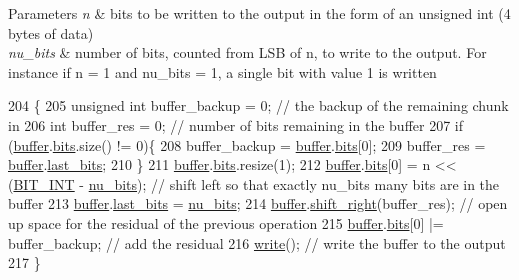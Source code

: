 \begin{DoxyParams}{Parameters}
{\em n} & bits to be written to the output in the form of an unsigned int (4 bytes of data) \\
\hline
{\em nu\+\_\+bits} & number of bits, counted from L\+SB of n, to write to the output. For instance if n = 1 and nu\+\_\+bits = 1, a single bit with value 1 is written \\
\hline
\end{DoxyParams}

\begin{DoxyCode}
204                                                                \{
205   \textcolor{keywordtype}{unsigned} \textcolor{keywordtype}{int} buffer\_backup = 0; \textcolor{comment}{// the backup of the remaining chunk in }
206   \textcolor{keywordtype}{int} buffer\_res = 0; \textcolor{comment}{// number of bits remaining in the buffer}
207   \textcolor{keywordflow}{if} (\hyperlink{classobitstream_aeaccad00a395a404aa16472bfa052be3}{buffer}.\hyperlink{classbit__pipe_a86f38af1e9736b053728033490476b50}{bits}.size() != 0)\{
208     buffer\_backup = \hyperlink{classobitstream_aeaccad00a395a404aa16472bfa052be3}{buffer}.\hyperlink{classbit__pipe_a86f38af1e9736b053728033490476b50}{bits}[0];
209     buffer\_res = \hyperlink{classobitstream_aeaccad00a395a404aa16472bfa052be3}{buffer}.\hyperlink{classbit__pipe_a0f3e84b02751803adaab499b5dad86fe}{last\_bits};
210   \}
211   \hyperlink{classobitstream_aeaccad00a395a404aa16472bfa052be3}{buffer}.\hyperlink{classbit__pipe_a86f38af1e9736b053728033490476b50}{bits}.resize(1);
212   \hyperlink{classobitstream_aeaccad00a395a404aa16472bfa052be3}{buffer}.\hyperlink{classbit__pipe_a86f38af1e9736b053728033490476b50}{bits}[0] = n << (\hyperlink{bitstream_8h_afcadf5aa65c5159bfb96c4d82ebc0a5d}{BIT\_INT} - \hyperlink{bitstream_8cpp_a9dfce6f51e3febb3973aa3b16c2fecb4}{nu\_bits}); \textcolor{comment}{// shift left so that exactly nu\_bits
       many bits are in the buffer}
213   \hyperlink{classobitstream_aeaccad00a395a404aa16472bfa052be3}{buffer}.\hyperlink{classbit__pipe_a0f3e84b02751803adaab499b5dad86fe}{last\_bits} = \hyperlink{bitstream_8cpp_a9dfce6f51e3febb3973aa3b16c2fecb4}{nu\_bits};
214   \hyperlink{classobitstream_aeaccad00a395a404aa16472bfa052be3}{buffer}.\hyperlink{classbit__pipe_a341a1f62d728a67f730503ca722a7770}{shift\_right}(buffer\_res); \textcolor{comment}{// open up space for the residual of the previous
       operation}
215   \hyperlink{classobitstream_aeaccad00a395a404aa16472bfa052be3}{buffer}.\hyperlink{classbit__pipe_a86f38af1e9736b053728033490476b50}{bits}[0] |= buffer\_backup; \textcolor{comment}{// add the residual }
216   \hyperlink{classobitstream_a5ac23633932baad040856f0a33ee1ebf}{write}(); \textcolor{comment}{// write the buffer to the output}
217 \}
\end{DoxyCode}


